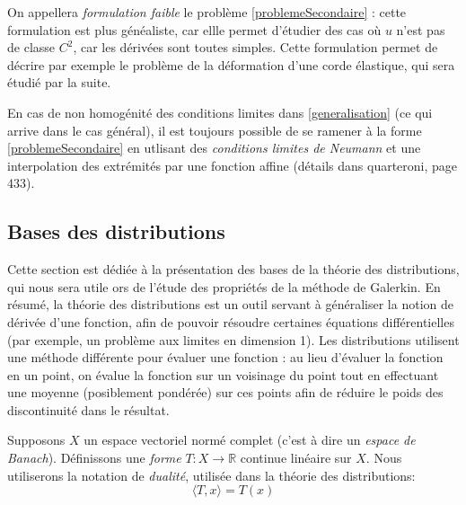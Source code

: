 \documentclass[12pt]{article}
\newcommand{\R}{\mathbb R}
\begin{document}
On appellera \emph{formulation faible} le problème \eqref{problemeSecondaire} : cette formulation est plus généaliste, car ellle permet d'étudier des cas où $u$ n'est pas de classe $C^2$, car les dérivées sont toutes simples. Cette formulation permet de décrire par exemple le problème de la déformation d'une corde élastique, qui sera étudié par la suite.

En cas de non homogénité des conditions limites dans \eqref{generalisation} (ce qui arrive dans le cas général), il est toujours possible de se ramener à la forme \eqref{problemeSecondaire} en utlisant des \emph{conditions limites de Neumann} et une interpolation des extrémités par une fonction affine (détails dans quarteroni, page 433).

\subsection{Bases des distributions}

Cette section est dédiée à la présentation des bases de la théorie des distributions, qui nous sera utile ors de l'étude des propriétés de la méthode de Galerkin. En résumé, la théorie des distributions est un outil servant à généraliser la notion de dérivée d'une fonction, afin de pouvoir résoudre certaines équations différentielles (par exemple, un problème aux limites en dimension 1). Les distributions utilisent une méthode différente pour évaluer une fonction : au lieu d'évaluer la fonction en un point, on évalue la fonction sur un voisinage du point tout en effectuant une moyenne (posiblement pondérée) sur ces points afin de réduire le poids des discontinuité dans le résultat.

Supposons $X$ un espace vectoriel normé complet (c'est à dire un \emph{espace de Banach}). Définissons une \emph{forme} $T: X \rightarrow \R$ continue linéaire sur $X$. Nous utiliserons la notation de \emph{dualité}, utilisée dans la théorie des distributions:
\begin{equation}
\langle T, x\rangle = T(x)
\end{equation}
\end{document}

